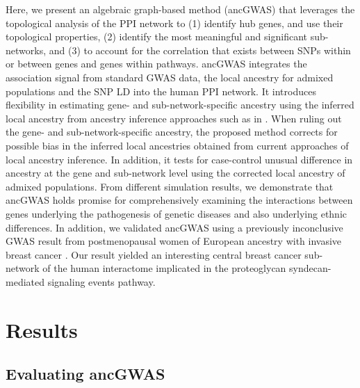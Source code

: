 \documentclass[10pt]{article}
\begin{document}
Here, we present an algebraic graph-based method (ancGWAS) that leverages the topological analysis of the PPI network to (1) identify hub genes, and use their topological properties, (2) identify the most meaningful and significant sub-networks, and (3) to account for the correlation that exists between SNPs within or between genes and genes within pathways. ancGWAS integrates the association signal from standard GWAS data, the local ancestry for admixed populations and the SNP LD into the human PPI network. It introduces flexibility in estimating gene- and sub-network-specific ancestry using the inferred local ancestry from ancestry inference approaches such as in \cite{winp,yael,painter,comt,pcadm,chmulti}. When ruling out the gene- and sub-network-specific ancestry, the proposed method corrects for possible bias in the inferred local ancestries obtained from current approaches of local ancestry inference. In addition, it tests for case-control unusual difference in ancestry at the gene and sub-network level using the corrected local ancestry of admixed populations. From different simulation results, we demonstrate that ancGWAS holds promise for comprehensively examining the interactions between genes underlying the pathogenesis of genetic diseases and also underlying ethnic differences. In addition, we validated ancGWAS using a previously inconclusive GWAS result from  postmenopausal women of European ancestry with invasive breast cancer \cite{hunter}. Our result yielded an interesting central breast cancer sub-network of the human interactome implicated in the proteoglycan syndecan-mediated signaling events pathway.


\section*{Results}

\subsection*{Evaluating ancGWAS}
\end{document}

